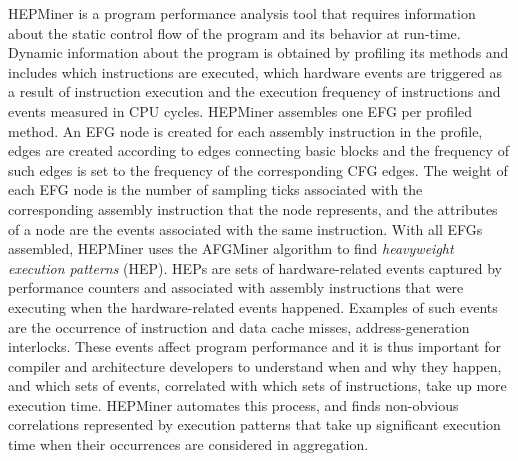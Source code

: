 HEPMiner is a program performance analysis tool that requires information about the static control flow of the program and its behavior at run-time. Dynamic information about the program is obtained by profiling its methods and includes which instructions are executed, which hardware events are triggered as a result of instruction execution and the execution frequency of instructions and events measured in CPU cycles. HEPMiner assembles one EFG per profiled method. An EFG node is created for each assembly instruction in the profile, edges are created according to edges connecting basic blocks and the frequency of such edges is set to the frequency of the corresponding CFG edges. The weight of each EFG node is the number of sampling ticks associated with the corresponding assembly instruction that the node represents, and the attributes of a node are the events associated with the same instruction.  With all EFGs assembled, HEPMiner uses the AFGMiner algorithm to find \emph{heavyweight execution patterns} (HEP). HEPs are sets of hardware-related events captured by performance counters and associated with assembly instructions that were executing when the hardware-related events happened. Examples of such events are the occurrence of instruction and data cache misses, address-generation interlocks. These events affect program performance and it is thus important for compiler and architecture developers to understand when and why they happen, and which sets of events, correlated with which sets of instructions, take up more execution time. HEPMiner automates this process, and finds non-obvious correlations represented by execution patterns that take up significant execution time when their occurrences are considered in aggregation.
